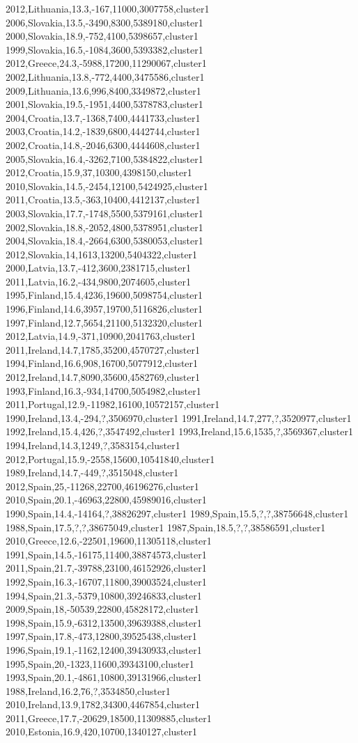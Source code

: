 2012,Lithuania,13.3,-167,11000,3007758,cluster1
2006,Slovakia,13.5,-3490,8300,5389180,cluster1
2000,Slovakia,18.9,-752,4100,5398657,cluster1
1999,Slovakia,16.5,-1084,3600,5393382,cluster1
2012,Greece,24.3,-5988,17200,11290067,cluster1
2002,Lithuania,13.8,-772,4400,3475586,cluster1
2009,Lithuania,13.6,996,8400,3349872,cluster1
2001,Slovakia,19.5,-1951,4400,5378783,cluster1
2004,Croatia,13.7,-1368,7400,4441733,cluster1
2003,Croatia,14.2,-1839,6800,4442744,cluster1
2002,Croatia,14.8,-2046,6300,4444608,cluster1
2005,Slovakia,16.4,-3262,7100,5384822,cluster1
2012,Croatia,15.9,37,10300,4398150,cluster1
2010,Slovakia,14.5,-2454,12100,5424925,cluster1
2011,Croatia,13.5,-363,10400,4412137,cluster1
2003,Slovakia,17.7,-1748,5500,5379161,cluster1
2002,Slovakia,18.8,-2052,4800,5378951,cluster1
2004,Slovakia,18.4,-2664,6300,5380053,cluster1
2012,Slovakia,14,1613,13200,5404322,cluster1
2000,Latvia,13.7,-412,3600,2381715,cluster1
2011,Latvia,16.2,-434,9800,2074605,cluster1
1995,Finland,15.4,4236,19600,5098754,cluster1
1996,Finland,14.6,3957,19700,5116826,cluster1
1997,Finland,12.7,5654,21100,5132320,cluster1
2012,Latvia,14.9,-371,10900,2041763,cluster1
2011,Ireland,14.7,1785,35200,4570727,cluster1
1994,Finland,16.6,908,16700,5077912,cluster1
2012,Ireland,14.7,8090,35600,4582769,cluster1
1993,Finland,16.3,-934,14700,5054982,cluster1
2011,Portugal,12.9,-11982,16100,10572157,cluster1
1990,Ireland,13.4,-294,?,3506970,cluster1
1991,Ireland,14.7,277,?,3520977,cluster1
1992,Ireland,15.4,426,?,3547492,cluster1
1993,Ireland,15.6,1535,?,3569367,cluster1
1994,Ireland,14.3,1249,?,3583154,cluster1
2012,Portugal,15.9,-2558,15600,10541840,cluster1
1989,Ireland,14.7,-449,?,3515048,cluster1
2012,Spain,25,-11268,22700,46196276,cluster1
2010,Spain,20.1,-46963,22800,45989016,cluster1
1990,Spain,14.4,-14164,?,38826297,cluster1
1989,Spain,15.5,?,?,38756648,cluster1
1988,Spain,17.5,?,?,38675049,cluster1
1987,Spain,18.5,?,?,38586591,cluster1
2010,Greece,12.6,-22501,19600,11305118,cluster1
1991,Spain,14.5,-16175,11400,38874573,cluster1
2011,Spain,21.7,-39788,23100,46152926,cluster1
1992,Spain,16.3,-16707,11800,39003524,cluster1
1994,Spain,21.3,-5379,10800,39246833,cluster1
2009,Spain,18,-50539,22800,45828172,cluster1
1998,Spain,15.9,-6312,13500,39639388,cluster1
1997,Spain,17.8,-473,12800,39525438,cluster1
1996,Spain,19.1,-1162,12400,39430933,cluster1
1995,Spain,20,-1323,11600,39343100,cluster1
1993,Spain,20.1,-4861,10800,39131966,cluster1
1988,Ireland,16.2,76,?,3534850,cluster1
2010,Ireland,13.9,1782,34300,4467854,cluster1
2011,Greece,17.7,-20629,18500,11309885,cluster1
2010,Estonia,16.9,420,10700,1340127,cluster1
